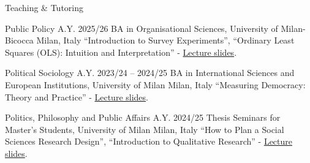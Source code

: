 \documentclass{cv}
\begin{document}
\begin{rSection}{Teaching \& Tutoring}
\subtitle{Guest Lectures}

\begin{teachingEntry}
{Public Policy}
{A.Y. 2025/26}
{BA in Organisational Sciences, University of Milan-Bicocca}
{Milan, Italy}
\enquote{Introduction to Survey Experiments}, \enquote{Ordinary Least Squares (OLS): Intuition and Interpretation} - \href{https://github.com/ste-sangiovanni/guest-lecture-regression-survey-experiments}{Lecture slides}.
\end{teachingEntry}

\begin{teachingEntry}
{Political Sociology}
{A.Y. 2023/24 -- 2024/25}
{BA in International Sciences and European Institutions, University of Milan}
{Milan, Italy}
\enquote{Measuring Democracy: Theory and Practice} - \href{https://github.com/ste-sangiovanni/democracy_seminar}{Lecture slides}.
\end{teachingEntry}

\begin{teachingEntry}
{Politics, Philosophy and Public Affairs}
{A.Y. 2024/25}
{Thesis Seminars for Master's Students, University of Milan}
{Milan, Italy}
\enquote{How to Plan a Social Sciences Research Design}, \enquote{Introduction to Qualitative Research} -  \href{https://github.com/ste-sangiovanni/PPPA_Thesis_Seminar}{Lecture slides}.
\end{teachingEntry}

\end{rSection}

\end{document}
